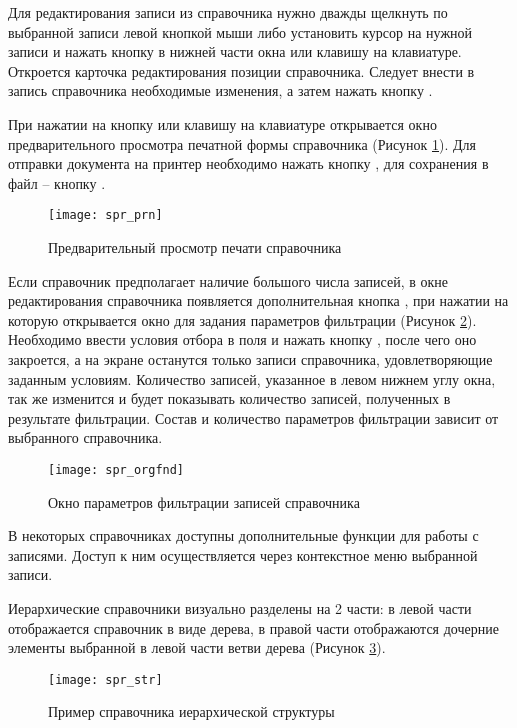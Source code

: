 Для редактирования записи из справочника нужно дважды щелкнуть по выбранной записи левой кнопкой мыши либо установить курсор на нужной записи и нажать кнопку  в нижней части окна или клавишу  на клавиатуре. Откроется карточка редактирования позиции справочника. Следует внести в запись справочника необходимые изменения, а затем нажать кнопку .

При нажатии на кнопку  или клавишу  на клавиатуре открывается окно предварительного просмотра печатной формы справочника (Рисунок \ref{img_spr_prn}). Для отправки документа на принтер необходимо нажать кнопку , для сохранения в файл – кнопку .

\begin{figure}[ht]\centering
 \texttt{[image: spr\_prn]}
 \caption{Предварительный просмотр печати справочника}
 \label{img_spr_prn}
\end{figure}

Если справочник предполагает наличие большого числа записей, в окне редактирования справочника появляется дополнительная кнопка , при нажатии на которую открывается окно для задания параметров фильтрации (Рисунок \ref{img_spr_orgfnd}). Необходимо ввести условия отбора в поля и нажать кнопку , после чего оно закроется, а на экране останутся только записи справочника, удовлетворяющие заданным условиям. Количество записей, указанное в левом нижнем углу окна, так же изменится и будет показывать количество записей, полученных в результате фильтрации. Состав и количество параметров фильтрации зависит от выбранного справочника.

\begin{figure}[ht!]\centering
 \texttt{[image: spr\_orgfnd]}
 \caption{Окно параметров фильтрации записей справочника}
 \label{img_spr_orgfnd}
\end{figure}

В некоторых справочниках доступны дополнительные функции для работы с записями. Доступ к ним осуществляется через контекстное меню выбранной записи.

Иерархические справочники визуально разделены на 2 части: в левой части отображается справочник в виде дерева, в правой части отображаются дочерние элементы выбранной в левой части ветви дерева (Рисунок \ref{img_spr_str}). 

\begin{figure}[ht]\centering
 \texttt{[image: spr\_str]}
 \caption{Пример справочника иерархической структуры}
 \label{img_spr_str}
\end{figure}

